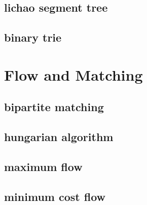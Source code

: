 \subsection{lichao segment tree}

\subsection{binary trie}


\section{Flow and Matching}
\subsection{bipartite matching}

\subsection{hungarian algorithm}

\subsection{maximum flow}

\subsection{minimum cost flow}

